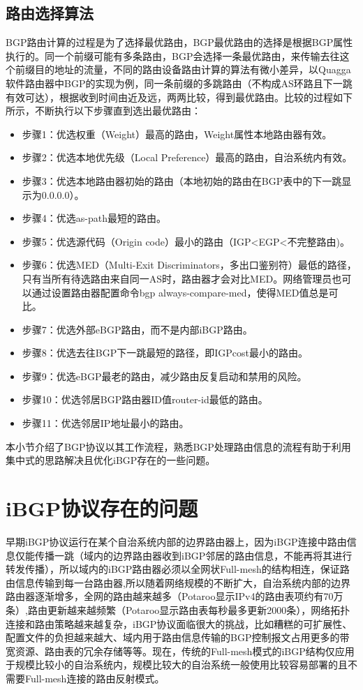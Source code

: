\subsection{路由选择算法}
BGP路由计算\cite{DianeTeare2016CCNP}的过程是为了选择最优路由，BGP最优路由的选择是根据BGP属性执行的。同一个前缀可能有多条路由，BGP会选择一条最优路由，来传输去往这个前缀目的地址的流量，不同的路由设备路由计算的算法有微小差异，以Quagga软件路由器中BGP的实现为例，同一条前缀的多跳路由（不构成AS环路且下一跳有效可达），根据收到时间由近及远，两两比较，得到最优路由。比较的过程如下所示，不断执行以下步骤直到选出最优路由：

\begin{itemize}
    \item 步骤1：优选权重（Weight）最高的路由，Weight属性本地路由器有效。
    \item 步骤2：优选本地优先级（Local Preference）最高的路由，自治系统内有效。
    \item 步骤3：优选本地路由器初始的路由（本地初始的路由在BGP表中的下一跳显示为0.0.0.0）。
    \item 步骤4：优选as-path最短的路由。
    \item 步骤5：优选源代码（Origin code）最小的路由（IGP<EGP<不完整路由)。
    \item 步骤6：优选MED（Multi-Exit Discriminators，多出口鉴别符）最低的路径，只有当所有待选路由来自同一AS时，路由器才会对比MED。网络管理员也可以通过设置路由器配置命令bgp always-compare-med，使得MED值总是可比。
    \item 步骤7：优选外部eBGP路由，而不是内部iBGP路由。
    \item 步骤8：优选去往BGP下一跳最短的路径，即IGPcost最小的路由。
    \item 步骤9：优选eBGP最老的路由，减少路由反复启动和禁用的风险。
    \item 步骤10：优选邻居BGP路由器ID值router-id最低的路由。
    \item 步骤11：优选邻居IP地址最小的路由。
\end{itemize}

本小节介绍了BGP协议以其工作流程，熟悉BGP处理路由信息的流程有助于利用集中式的思路解决且优化iBGP存在的一些问题。

\section{iBGP协议存在的问题}

早期iBGP协议运行在某个自治系统内部的边界路由器上，因为iBGP连接中路由信息仅能传播一跳（域内的边界路由器收到iBGP邻居的路由信息，不能再将其进行转发传播），所以域内的iBGP路由器必须以全网状Full-mesh的结构相连，保证路由信息传输到每一台路由器,所以随着网络规模的不断扩大，自治系统内部的边界路由器逐渐增多，全网的路由越来越多（Potaroo\cite{bgptabledata}显示IPv4的路由表项约有70万条）,路由更新越来越频繁（Potaroo显示路由表每秒最多更新2000条），网络拓扑连接和路由策略越来越复杂，iBGP协议面临很大的挑战\cite{ibgp2016infocom}，比如糟糕的可扩展性、配置文件的负担越来越大、域内用于路由信息传输的BGP控制报文占用更多的带宽资源、路由表的冗余存储等等。现在，传统的Full-mesh模式的iBGP结构仅应用于规模比较小的自治系统内，规模比较大的自治系统一般使用比较容易部署的且不需要Full-mesh连接的路由反射\cite{rfc2796}模式。

